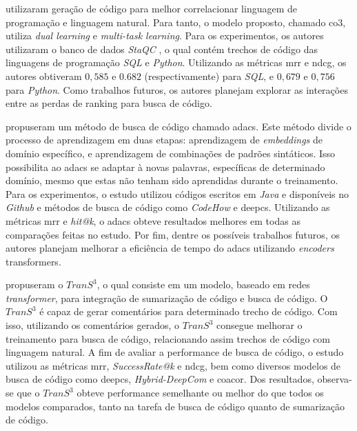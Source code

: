 \textcite{Ye2020LeveragingCG} utilizaram geração de código para melhor correlacionar linguagem de programação e linguagem natural. Para tanto, o modelo proposto, chamado \gls{co3}, utiliza \textit{dual
learning} e \textit{multi-task learning}. Para os experimentos, os autores utilizaram o banco de dados \textit{StaQC} \cite{Yao2018StaQCAS}, o qual contém trechos de código das linguagens de programação \textit{SQL} e \textit{Python}. Utilizando as métricas \gls{mrr} e \gls{ndcg}, os autores obtiveram $0,585$ e $0.682$ (respectivamente) para \textit{SQL}, e $0,679$ e  $0,756$ para \textit{Python}. Como trabalhos futuros, os autores planejam explorar as interações entre as perdas de ranking para busca de código.

\textcite{Ling2020AdaptiveDC} propuseram um método de busca de código chamado \gls{adacs}. Este método divide o processo de aprendizagem em duas etapas: aprendizagem de \textit{embeddings} de domínio específico, e aprendizagem de combinações de padrões sintáticos. Isso possibilita ao \gls{adacs} se adaptar à novas palavras, específicas de determinado domínio, mesmo que estas não tenham sido aprendidas durante o treinamento. Para os experimentos, o estudo utilizou códigos escritos em \textit{Java} e disponíveis no \textit{Github} e métodos de busca de código como \textit{CodeHow} e \gls{deepcs}. Utilizando as métricas \gls{mrr} e \textit{hit@k}, o \gls{adacs} obteve resultados melhores em todas as comparações feitas no estudo. Por fim, dentre os possíveis trabalhos futuros, os autores planejam melhorar a eficiência de tempo do \gls{adacs} utilizando \textit{encoders} transformers.

\textcite{Wang2020TranS3AT} propuseram o $TranS^3$, o qual consiste em um modelo, baseado em redes \textit{transformer}, para integração de sumarização de código e busca de código. O $TranS^3$ é capaz de gerar comentários para determinado trecho de código. Com isso, utilizando os comentários gerados, o $TranS^3$ consegue melhorar o treinamento para busca de código, relacionando assim trechos de código com linguagem natural. A fim de avaliar a performance de busca de código, o estudo utilizou as métricas \gls{mrr}, \textit{SuccessRate@k} e \gls{ndcg}, bem como diversos modelos de busca de código como \gls{deepcs}, \textit{Hybrid-DeepCom} e \gls{coacor}. Dos resultados, observa-se que o $TranS^3$ obteve performance semelhante ou melhor do que todos os modelos comparados, tanto na tarefa de busca de código quanto de sumarização de código.

